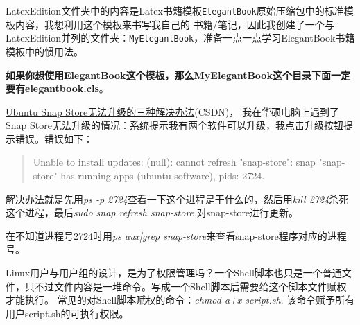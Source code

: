 \documentclass[lang=cn,newtx,12pt,scheme=chinese]{elegantbook}
\begin{document}
LatexEdition文件夹中的内容是Latex书籍模板\lstinline{ElegantBook}原始压缩包中的标准模板内容，我想利用这个模板来书写我自己的
书籍/笔记，因此我创建了一个与LatexEdition并列的文件夹：\lstinline{MyElegantBook}，准备一点一点学习ElegantBook书籍模板中的惯用法。

\textbf{如果你想使用ElegantBook这个模板，那么MyElegantBook这个目录下面一定要有elegantbook.cls}。

\href{https://blog.csdn.net/qq_44935032/article/details/130721017}{Ubuntu Snap Store无法升级的三种解决办法}(CSDN)，
我在华硕电脑上遇到了Snap Store无法升级的情况：系统提示我有两个软件可以升级，我点击升级按钮提示错误。错误如下：

\begin{quotation}
    Unable to install updates: (null): cannot refresh "snap-store": snap "snap-store" has running apps (ubuntu-software), 
    pids: 2724.
\end{quotation}

解决办法就是先用\textit{ps -p 2724}查看一下这个进程是干什么的，然后用\textit{kill 2724}杀死这个进程，最后\textit{sudo snap refresh snap-store}
对snap-store进行更新。

在不知道进程号2724时用\textit{ps aux|grep snap-store}来查看snap-store程序对应的进程号。

Linux用户与用户组的设计，是为了权限管理吗？一个Shell脚本也只是一个普通文件，只不过文件内容是一堆命令。写成一个Shell脚本后需要给这个脚本文件赋权才能执行。
常见的对Shell脚本赋权的命令：\textit{chmod a+x script.sh}. 该命令赋予所有用户script.sh的可执行权限。
\end{document}
